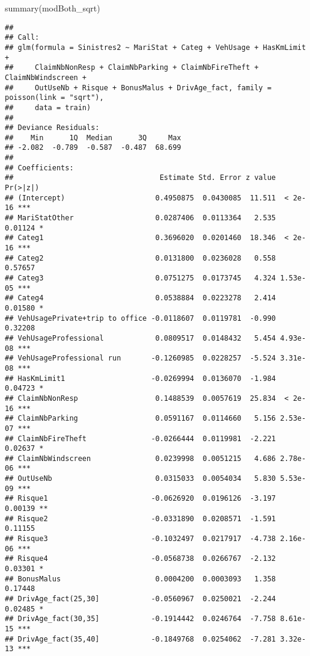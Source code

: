 \documentclass[
]{article}
\newenvironment{Shaded}{\begin{snugshade}}{\end{snugshade}}
\newcommand{\FunctionTok}[1]{\textcolor[rgb]{0.00,0.00,0.00}{#1}}
\newcommand{\NormalTok}[1]{#1}
\begin{document}
\begin{Shaded}
\begin{Highlighting}[]
\FunctionTok{summary}\NormalTok{(modBoth\_sqrt)}
\end{Highlighting}
\end{Shaded}

\begin{verbatim}
## 
## Call:
## glm(formula = Sinistres2 ~ MariStat + Categ + VehUsage + HasKmLimit + 
##     ClaimNbNonResp + ClaimNbParking + ClaimNbFireTheft + ClaimNbWindscreen + 
##     OutUseNb + Risque + BonusMalus + DrivAge_fact, family = poisson(link = "sqrt"), 
##     data = train)
## 
## Deviance Residuals: 
##    Min      1Q  Median      3Q     Max  
## -2.082  -0.789  -0.587  -0.487  68.699  
## 
## Coefficients:
##                                  Estimate Std. Error z value Pr(>|z|)    
## (Intercept)                     0.4950875  0.0430085  11.511  < 2e-16 ***
## MariStatOther                   0.0287406  0.0113364   2.535  0.01124 *  
## Categ1                          0.3696020  0.0201460  18.346  < 2e-16 ***
## Categ2                          0.0131800  0.0236028   0.558  0.57657    
## Categ3                          0.0751275  0.0173745   4.324 1.53e-05 ***
## Categ4                          0.0538884  0.0223278   2.414  0.01580 *  
## VehUsagePrivate+trip to office -0.0118607  0.0119781  -0.990  0.32208    
## VehUsageProfessional            0.0809517  0.0148432   5.454 4.93e-08 ***
## VehUsageProfessional run       -0.1260985  0.0228257  -5.524 3.31e-08 ***
## HasKmLimit1                    -0.0269994  0.0136070  -1.984  0.04723 *  
## ClaimNbNonResp                  0.1488539  0.0057619  25.834  < 2e-16 ***
## ClaimNbParking                  0.0591167  0.0114660   5.156 2.53e-07 ***
## ClaimNbFireTheft               -0.0266444  0.0119981  -2.221  0.02637 *  
## ClaimNbWindscreen               0.0239998  0.0051215   4.686 2.78e-06 ***
## OutUseNb                        0.0315033  0.0054034   5.830 5.53e-09 ***
## Risque1                        -0.0626920  0.0196126  -3.197  0.00139 ** 
## Risque2                        -0.0331890  0.0208571  -1.591  0.11155    
## Risque3                        -0.1032497  0.0217917  -4.738 2.16e-06 ***
## Risque4                        -0.0568738  0.0266767  -2.132  0.03301 *  
## BonusMalus                      0.0004200  0.0003093   1.358  0.17448    
## DrivAge_fact(25,30]            -0.0560967  0.0250021  -2.244  0.02485 *  
## DrivAge_fact(30,35]            -0.1914442  0.0246764  -7.758 8.61e-15 ***
## DrivAge_fact(35,40]            -0.1849768  0.0254062  -7.281 3.32e-13 ***

\end{verbatim}
\end{document}
